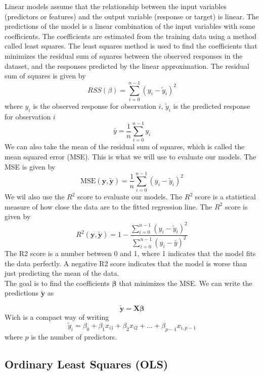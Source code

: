 \documentclass[twoside,11pt]{report}
\begin{document}
Linear models assume that the relationship between the input variables (predictors or features) 
and the output variable (response or target) is linear. The predictions of the model is a linear
combination of the input variables with some coefficients. The coefficients are estimated from
the training data using a method called least squares. The least squares method is used to find
the coefficients that minimizes the residual sum of squares between the observed responses in
the dataset, and the responses predicted by the linear approximation. The residual sum of squares
is given by
$$
RSS(\beta) = \sum_{i=0}^{n-1} (y_i - \tilde{y}_i)^2
$$
where $y_i$ is the observed response for observation $i$, $\tilde{y}_i$ is the predicted response for observation $i$ 
$$
\bar{y} =  \frac{1}{n} \sum_{i=0}^{n - 1} y_i
$$
We can also take the mean of the residual sum of squares, which is called the mean squared error (MSE). This is what we will use to
evaluate our models. The MSE is given by
$$
\mbox{MSE}(\mathbf{y},\mathbf{\tilde{y}}) = \frac{1}{n}
\sum_{i=0}^{n-1}(y_i-\tilde{y}_i)^2
$$
We wil also use the $R^2$ score to evaluate our models. The $R^2$ score is a statistical measure of how close the data are to the fitted regression line. The $R^2$ score is given by
$$
R^2(\mathbf{y}, \tilde{\mathbf{y}}) = 1 - \frac{\sum_{i=0}^{n - 1} (y_i - \tilde{y}_i)^2}{\sum_{i=0}^{n - 1} (y_i - \bar{y})^2}
$$
The R2 score is a number between 0 and 1, where 1 indicates that the model fits the data perfectly. 
A negative R2 score indicates that the model is worse than just predicting the mean of the data.\\
The goal is to find the coefficients $\boldsymbol{\beta}$ that minimizes the MSE. We can write the predictions $\tilde{\mathbf{y}}$ as

$$
\tilde{\mathbf{y}} = \mathbf{X}\boldsymbol{\beta}
$$
Wich is a compact way of writing
$$
\tilde{y}_i = \beta_0 + \beta_1 x_{i1} + \beta_2 x_{i2} + \dots + \beta_{p-1} x_{i,p-1}
$$
where $p$ is the number of predictors.\\





\subsection{Ordinary Least Squares (OLS)}
\label{sec:ols}
\end{document}
